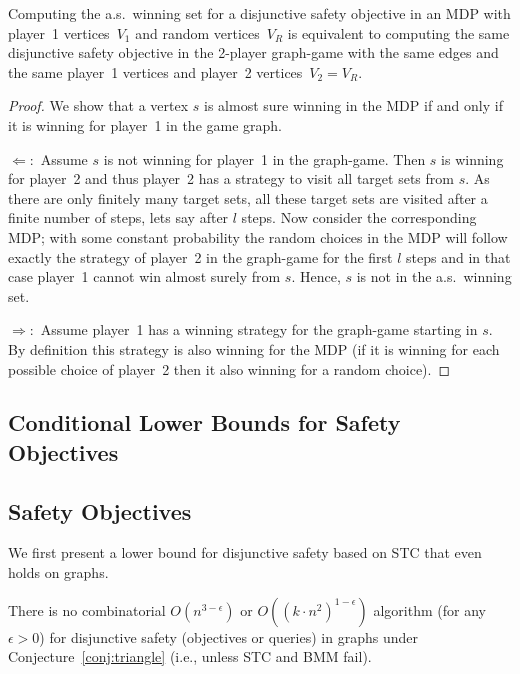 \documentclass[11pt,letterpaper]{article}
\newcommand{\lu}{\textup{(}}
\newcommand{\ru}{\textup{)}\xspace}
\newcommand{\upbr}[1]{\lu #1\ru}
\newcommand{\vo}{V_1\xspace}
\newcommand{\vr}{V_R\xspace}
\newif\iffullversion
\newcommand{\infull}[1]{\iffullversion #1\fi}
\newcommand{\inshort}[1]{\iffullversion \else #1\fi}
\begin{document}
{\begin{observation}\label{obs:SafetyGames}
    Computing the a.s.\ winning set for a disjunctive safety objective in an MDP 
    with player~1 vertices~$\vo$ and random vertices~$\vr$ is equivalent to 
    computing the same disjunctive safety objective in the 2-player graph-game
    with the same edges and the same player~1 vertices and 
    player~2 vertices~$V_2 = \vr$.
\end{observation}
\begin{proof}
 We show that a vertex $s$ is almost sure winning in the MDP if and only if it is winning for player~1 in the game graph.
 
 \noindent $\Leftarrow:$ Assume $s$ is not winning for player~1 in the graph-game. 
	       Then $s$ is winning for player~2 and thus player~2 has a strategy to visit all target sets from $s$.
	       As there are only finitely many target sets, all these target sets are visited after a finite number of steps,
	       lets say after $l$ steps.
	       Now consider the corresponding MDP; with some constant probability the random choices in the MDP will follow exactly the strategy of player~2 in the 
	       graph-game for the first $l$
	       steps and in that case player~1 cannot win almost surely from $s$.
	       Hence, $s$ is not in the a.s.\ winning set.
 
 \noindent $\Rightarrow:$ Assume player~1 has a winning strategy for the graph-game
 starting in $s$.
    By definition this strategy is also winning for the MDP (if it is winning for each possible choice of player~2 then it also
    winning for a random choice).
\end{proof}

\subsection{Conditional Lower Bounds for Safety Objectives}\label{subsec:safety_lowerbounds}
}
\inshort{
\subsection{Safety Objectives}\label{subsec:safety_lowerbounds}
}

We first present a lower bound for disjunctive safety based on STC that even holds on graphs.

\begin{theorem}\label{thm:safety_STChard}
  There is no combinatorial $O(n^{3-\epsilon})$ or $O((k\cdot n^2)^{1-\epsilon})$ algorithm \upbr{for any $\epsilon > 0$} for disjunctive safety \upbr{objectives or queries} in graphs under  Conjecture~\ref{conj:triangle} \upbr{i.e., unless STC and BMM fail}. 
  \infull{In particular, there is no such algorithm deciding whether the winning set is non-empty
  or deciding whether a specific vertex is in the winning set.}
\end{theorem}
\end{document}
